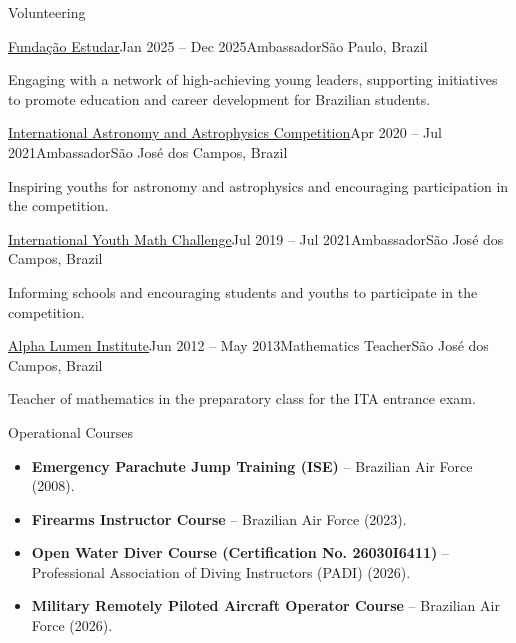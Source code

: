 \documentclass{resume} %
\begin{document}
\begin{rSection}{Volunteering}

\begin{rSubsection}{\href{https://www.estudar.org.br/}{Fundação Estudar}}{Jan 2025 -- Dec 2025}{Ambassador}{São Paulo, Brazil}
\item Engaging with a network of high-achieving young leaders, supporting initiatives to promote education and career development for Brazilian students.
\end{rSubsection}

\begin{rSubsection}{\href{https://iaac.space/}{International Astronomy and Astrophysics Competition}}{Apr 2020 -- Jul 2021}{Ambassador}{São José dos Campos, Brazil}
\item Inspiring youths for astronomy and astrophysics and encouraging participation in the competition.
\end{rSubsection}

\begin{rSubsection}{\href{https://iymc.info/}{International Youth Math Challenge}}{Jul 2019 -- Jul 2021}{Ambassador}{São José dos Campos, Brazil}
\item Informing schools and encouraging students and youths to participate in the competition.
\end{rSubsection}

\begin{rSubsection}{\href{https://alphalumen.org.br/}{Alpha Lumen Institute}}{Jun 2012 -- May 2013}{Mathematics Teacher}{São José dos Campos, Brazil}
\item Teacher of mathematics in the preparatory class for the ITA entrance exam.
\end{rSubsection}

\end{rSection}


\begin{rSection}{Operational Courses}
\begin{itemize}
    \item \textbf{Emergency Parachute Jump Training (ISE)} -- Brazilian Air Force (2008).
    \item \textbf{Firearms Instructor Course} -- Brazilian Air Force (2023).
    \item \textbf{Open Water Diver Course (Certification No. 26030I6411)} -- Professional Association of Diving Instructors (PADI) (2026).
    \item \textbf{Military Remotely Piloted Aircraft Operator Course} -- Brazilian Air Force (2026).
\end{itemize}
\end{rSection}
\end{document}
